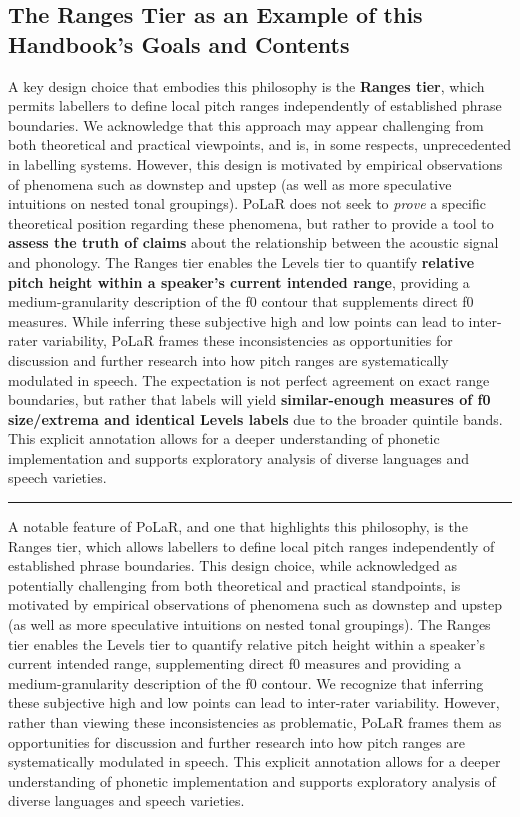 \documentclass[11pt, twoside]{memoir}
\begin{document}
\subsection{The Ranges Tier as an Example of this Handbook's Goals and Contents}

A key design choice that embodies this philosophy is the \textbf{Ranges tier}, which permits labellers to define local pitch ranges independently of established phrase boundaries. We acknowledge that this approach may appear challenging from both theoretical and practical viewpoints, and is, in some respects, unprecedented in labelling systems. However, this design is motivated by empirical observations of phenomena such as downstep and upstep (as well as more speculative intuitions on nested tonal groupings). PoLaR does not seek to \textit{prove} a specific theoretical position regarding these phenomena, but rather to provide a tool to \textbf{assess the truth of claims} about the relationship between the acoustic signal and phonology. The Ranges tier enables the Levels tier to quantify \textbf{relative pitch height within a speaker's current intended range}, providing a medium-granularity description of the f0 contour that supplements direct f0 measures. While inferring these subjective high and low points can lead to inter-rater variability, PoLaR frames these inconsistencies as opportunities for discussion and further research into how pitch ranges are systematically modulated in speech. The expectation is not perfect agreement on exact range boundaries, but rather that labels will yield \textbf{similar-enough measures of f0 size{\slash}extrema and identical Levels labels} due to the broader quintile bands. This explicit annotation allows for a deeper understanding of phonetic implementation and supports exploratory analysis of diverse languages and speech varieties.

\hrule

A notable feature of PoLaR, and one that highlights this philosophy, is the Ranges tier, which allows labellers to define local pitch ranges independently of established phrase boundaries. This design choice, while acknowledged as potentially challenging from both theoretical and practical standpoints, is motivated by empirical observations of phenomena such as downstep and upstep (as well as more speculative intuitions on nested tonal groupings). The Ranges tier enables the Levels tier to quantify relative pitch height within a speaker's current intended range, supplementing direct f0 measures and providing a medium-granularity description of the f0 contour. We recognize that inferring these subjective high and low points can lead to inter-rater variability. However, rather than viewing these inconsistencies as problematic, PoLaR frames them as opportunities for discussion and further research into how pitch ranges are systematically modulated in speech. This explicit annotation allows for a deeper understanding of phonetic implementation and supports exploratory analysis of diverse languages and speech varieties.
\end{document}
